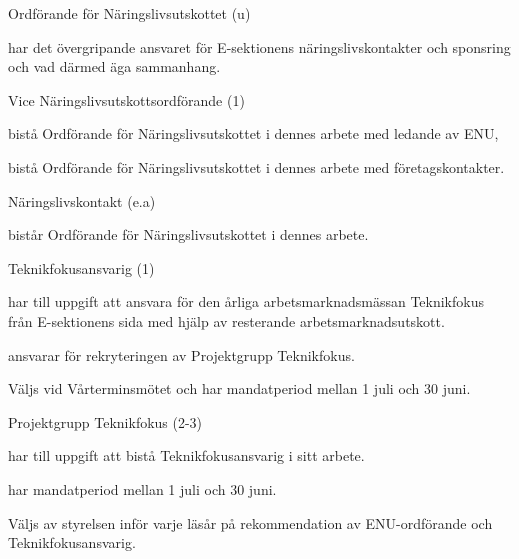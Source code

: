 \documentclass[10pt]{article}
\begin{document}
\begin{emptylist}
    \item Ordförande för Näringslivsutskottet (u)
        \begin{dashlist}
            \item har det övergripande ansvaret för E-sektionens
                näringslivskontakter och sponsring och vad därmed äga
                sammanhang.
        \end{dashlist}
    \item Vice Näringslivsutskottsordförande (1)
        \begin{dashlist}
            \item bistå Ordförande för Näringslivsutskottet i dennes arbete med ledande av ENU,
            \item bistå Ordförande för Näringslivsutskottet i dennes arbete med företagskontakter.
        \end{dashlist}
    \item Näringslivskontakt (e.a)
        \begin{dashlist}
            \item bistår Ordförande för Näringslivsutskottet i dennes arbete.
        \end{dashlist}
    \item Teknikfokusansvarig (1)
    		\begin{dashlist}
    			\item har till uppgift att ansvara för den årliga arbetsmarknadsmässan Teknikfokus från E-sektionens sida med hjälp av resterande arbetsmarknadsutskott.
    			\item ansvarar för rekryteringen av Projektgrupp Teknikfokus.
                \item Väljs vid Vårterminsmötet och har mandatperiod mellan 1 juli och 30 juni.
    		\end{dashlist}
    	\item Projektgrupp Teknikfokus (2-3)
    		\begin{dashlist}
    			\item har till uppgift att bistå Teknikfokusansvarig i sitt arbete.
    			\item har mandatperiod mellan 1 juli och 30 juni.
    			\item Väljs av styrelsen inför varje läsår på rekommendation av ENU-ordförande och Teknikfokusansvarig.
    		\end{dashlist}
\end{emptylist}
\end{document}
